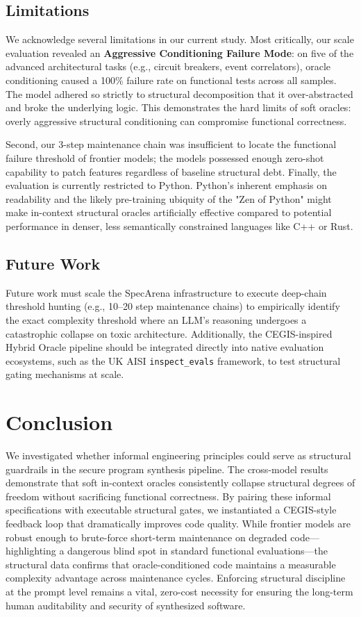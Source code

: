 \documentclass[11pt]{article}
\begin{document}
\subsection{Limitations}

We acknowledge several limitations in our current study. Most critically, our scale evaluation revealed an \textbf{Aggressive Conditioning Failure Mode}: on five of the advanced architectural tasks (e.g., circuit breakers, event correlators), oracle conditioning caused a 100\% failure rate on functional tests across all samples. The model adhered so strictly to structural decomposition that it over-abstracted and broke the underlying logic. This demonstrates the hard limits of soft oracles: overly aggressive structural conditioning can compromise functional correctness.

Second, our 3-step maintenance chain was insufficient to locate the functional failure threshold of frontier models; the models possessed enough zero-shot capability to patch features regardless of baseline structural debt. Finally, the evaluation is currently restricted to Python. Python's inherent emphasis on readability and the likely pre-training ubiquity of the "Zen of Python" might make in-context structural oracles artificially effective compared to potential performance in denser, less semantically constrained languages like C++ or Rust.

\subsection{Future Work}

Future work must scale the SpecArena infrastructure to execute deep-chain threshold hunting (e.g., 10--20 step maintenance chains) to empirically identify the exact complexity threshold where an LLM's reasoning undergoes a catastrophic collapse on toxic architecture. Additionally, the CEGIS-inspired Hybrid Oracle pipeline should be integrated directly into native evaluation ecosystems, such as the UK AISI \texttt{inspect\_evals} framework, to test structural gating mechanisms at scale.

\section{Conclusion}

We investigated whether informal engineering principles could serve as structural guardrails in the secure program synthesis pipeline. The cross-model results demonstrate that soft in-context oracles consistently collapse structural degrees of freedom without sacrificing functional correctness. By pairing these informal specifications with executable structural gates, we instantiated a CEGIS-style feedback loop that dramatically improves code quality. While frontier models are robust enough to brute-force short-term maintenance on degraded code---highlighting a dangerous blind spot in standard functional evaluations---the structural data confirms that oracle-conditioned code maintains a measurable complexity advantage across maintenance cycles. Enforcing structural discipline at the prompt level remains a vital, zero-cost necessity for ensuring the long-term human auditability and security of synthesized software.
\end{document}
